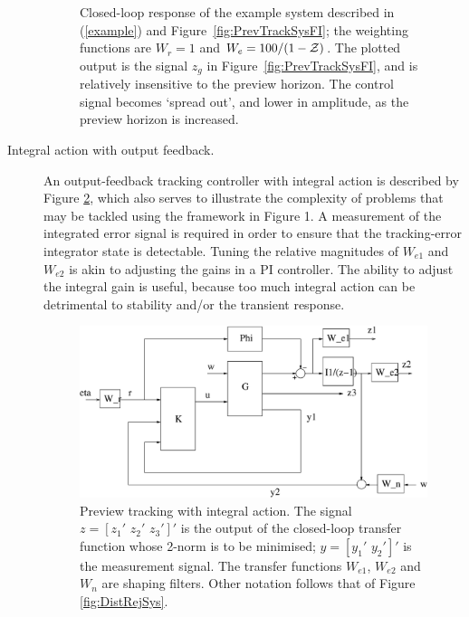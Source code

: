 \begin{description}
\begin{figure}
\caption{Closed-loop response of the example system described in (\ref{example}) and Figure~\ref{fig:PrevTrackSysFI}; the weighting functions are $W_r=1$ and $W_e=100/(1-\mathcal{Z})$. The plotted output is the signal $z_g$ in Figure~\ref{fig:PrevTrackSysFI}, and is relatively insensitive to the preview horizon. The control signal becomes `spread out', and lower in amplitude, as the preview horizon is increased. \label{fig:ReducingControlWithIncreasingN}}
\end{figure}
\item[Integral action with output feedback.]
An output-feedback tracking controller with integral action is described by Figure \ref{fig:TrackSysInteg}, which also serves to
illustrate the complexity of problems that may be tackled  using the framework in Figure 1.
A measurement of the integrated error signal is required in order to ensure that the tracking-error integrator state is  detectable. 
Tuning the relative magnitudes of $W_{e1}$ and $W_{e2}$ is akin to adjusting the gains in a PI controller. The ability to adjust the integral gain is useful, because too much integral action can be detrimental to stability and/or the transient response.
\begin{figure}
\begin{center}
\stdcontrolfrags
{}
\includegraphics[width=12cm]{./diags/TrackSysInteg.eps}
\end{center}
\caption{Preview tracking with integral action. The signal $z=\left[z_1'\,\,z_2'\,\,z_3'\right]'$ is the output of the closed-loop transfer function
whose 2-norm is to be minimised; $y=\left[y_1'\,\,y_2'\right]'$ is the measurement signal. The transfer functions $W_{e1}$, $W_{e2}$ and $W_n$ are shaping filters. Other notation follows that of Figure \ref{fig:DistRejSys}. \label{fig:TrackSysInteg}}
\end{figure}
\end{description}
 


 





